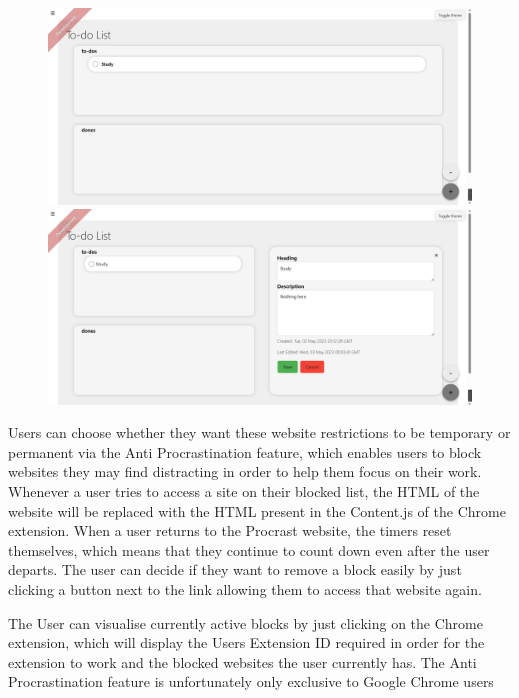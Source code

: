 \documentclass[a4paper]{article}
\begin{document}
\begin{figure}[H]
    \centering
    \begin{minipage}{0.49\textwidth}
      \centering
      \includegraphics[width=\linewidth]{./image/todolist_1.png}
    \end{minipage}\hfill
    \begin{minipage}{0.49\textwidth}
      \centering
      \includegraphics[width=\linewidth]{./image/todolist_2.png}
    \end{minipage}
\end{figure}

Users can choose whether they want these website restrictions to be temporary or permanent via the Anti Procrastination feature, which enables users to block websites they may find distracting in order to help them focus on their work.
Whenever a user tries to access a site on their blocked list, the HTML of the
website will be replaced with the HTML present in the Content.js of the Chrome extension.
When a user returns to the Procrast website, the timers reset themselves, which means that they continue to count down even after the user departs.
The user can decide if they want to remove a block easily by just clicking a button next to the link allowing them to access that website again.

The User can visualise currently active blocks by just clicking on the Chrome extension,  which will display the Users Extension ID required in order for the extension to work and the blocked websites the user currently has.
The Anti Procrastination feature is unfortunately only exclusive to Google Chrome users
\end{document}
